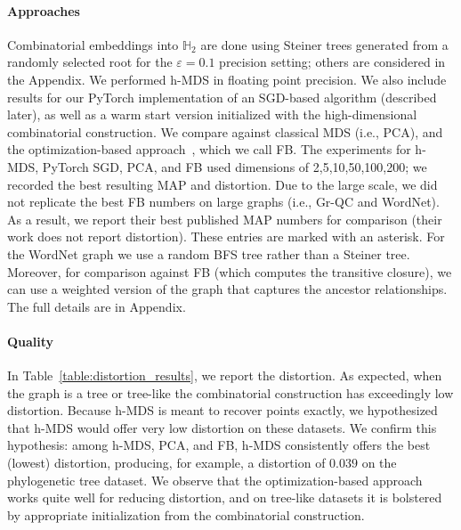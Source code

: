 \paragraph*{Approaches} Combinatorial
embeddings into $\mathbb{H}_2$ are done using Steiner trees generated
from a randomly selected root for the $\varepsilon=0.1$ precision
setting; others are considered in the Appendix. We performed h-MDS in
floating point precision.
We also include results for our PyTorch implementation of an SGD-based algorithm (described later),
as well as a warm start version initialized with the high-dimensional combinatorial construction.
We compare against classical MDS (i.e.,
PCA), and the optimization-based approach~\citet{fb}, which we call
FB. The experiments for h-MDS, PyTorch SGD, PCA, and FB used dimensions of
2,5,10,50,100,200; we recorded the best resulting MAP and
distortion. Due to the large scale, we did not replicate the best FB
numbers on large graphs (i.e., Gr-QC and WordNet).
As a result, we
report their best published MAP numbers for comparison (their work does not report distortion). These entries are marked with an asterisk. For the WordNet
graph we use a random BFS tree rather than a Steiner tree. Moreover, for comparison against FB (which computes the transitive closure), we can use a weighted version of the graph that captures the ancestor relationships. The full details are in Appendix.


\paragraph*{Quality}
In Table~\ref{table:distortion_results}, we report the distortion. As
expected, when the graph is a tree or tree-like the combinatorial
construction has exceedingly low distortion. Because h-MDS is meant to recover
points exactly, we hypothesized that h-MDS would offer very low distortion
on these datasets. We confirm this hypothesis: among h-MDS, PCA, and FB, h-MDS
consistently offers the best (lowest) distortion, producing, for
example, a distortion of $0.039$ on the phylogenetic tree dataset. %
We observe that the optimization-based approach works quite well for reducing distortion,
and on tree-like datasets it is bolstered by appropriate initialization from the combinatorial construction.


